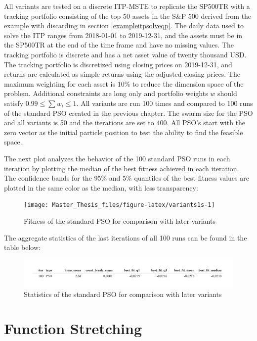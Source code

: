 \documentclass[
  oneside, a4paper, 12pt, openany]{book}
\theoremstyle{definition}
\theoremstyle{definition}
\theoremstyle{definition}
\theoremstyle{definition}
\theoremstyle{remark}
\begin{document}
All variants are tested on a discrete ITP-MSTE to replicate the SP500TR with a tracking portfolio consisting of the top 50 assets in the S\&P 500 derived from the example with discarding in section \ref{exampleitpsolveqp}. The daily data used to solve the ITP ranges from 2018-01-01 to 2019-12-31, and the assets must be in the SP500TR at the end of the time frame and have no missing values. The tracking portfolio is discrete and has a net asset value of twenty thousand USD. The tracking portfolio is discretized using closing prices on 2019-12-31, and returns are calculated as simple returns using the adjusted closing prices. The maximum weighting for each asset is 10\% to reduce the dimension space of the problem. Additional constraints are long only and portfolio weights \(w\) should satisfy \(0.99 \leq \textstyle\sum w_i \leq 1\). All variants are run 100 times and compared to 100 runs of the standard PSO created in the previous chapter. The swarm size for the PSO and all variants is 50 and the iterations are set to 400. All PSO's start with the zero vector as the initial particle position to test the ability to find the feasible space.

The next plot analyzes the behavior of the 100 standard PSO runs in each iteration by plotting the median of the best fitness achieved in each iteration. The confidence bands for the 95\% and 5\% quantiles of the best fitness values are plotted in the same color as the median, with less transparency:

\begin{figure}[H]
\texttt{[image: Master\_Thesis\_files/figure-latex/variants1s-1]} \caption{Fitness of the standard PSO for comparison with later variants}\label{fig:variants1s}
\end{figure}

The aggregate statistics of the last iterations of all 100 runs can be found in the table below:

\begin{figure}[H]
\includegraphics{Master_Thesis_files/figure-latex/variants2-1} \caption{Statistics of the standard PSO for comparison with later variants}\label{fig:variants2}
\end{figure}

\hypertarget{function-stretching}{%
\section{Function Stretching}\label{function-stretching}}
\end{document}
